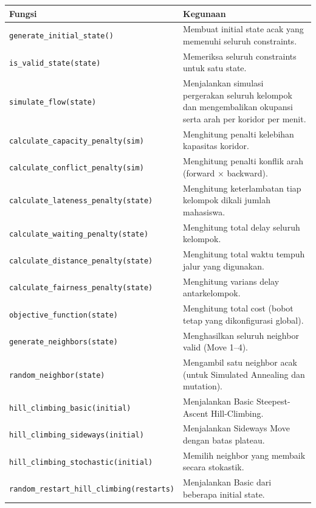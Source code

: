 \documentclass[11pt,a4paper]{article}
\begin{document}
{\footnotesize
\begin{tabularx}{\textwidth}{|>{\raggedright\arraybackslash}p{6.5cm}|>{\raggedright\arraybackslash}X|}
\hline
\textbf{Fungsi} & \textbf{Kegunaan} \\
\hline
\texttt{generate\_initial\_state()} & Membuat initial state acak yang memenuhi seluruh constraints. \\
\hline
\texttt{is\_valid\_state(state)} & Memeriksa seluruh constraints untuk satu state. \\
\hline
\texttt{simulate\_flow(state)} & Menjalankan simulasi pergerakan seluruh kelompok dan mengembalikan okupansi serta arah per koridor per menit. \\
\hline
\texttt{calculate\_capacity\_penalty(sim)} & Menghitung penalti kelebihan kapasitas koridor. \\
\hline
\texttt{calculate\_conflict\_penalty(sim)} & Menghitung penalti konflik arah (forward $\times$ backward). \\
\hline
\texttt{calculate\_lateness\_penalty(state)} & Menghitung keterlambatan tiap kelompok dikali jumlah mahasiswa. \\
\hline
\texttt{calculate\_waiting\_penalty(state)} & Menghitung total delay seluruh kelompok. \\
\hline
\texttt{calculate\_distance\_penalty(state)} & Menghitung total waktu tempuh jalur yang digunakan. \\
\hline
\texttt{calculate\_fairness\_penalty(state)} & Menghitung varians delay antarkelompok. \\
\hline
\texttt{objective\_function(state)} & Menghitung total cost (bobot tetap yang dikonfigurasi global). \\
\hline
\texttt{generate\_neighbors(state)} & Menghasilkan seluruh neighbor valid (Move 1--4). \\
\hline
\texttt{random\_neighbor(state)} & Mengambil satu neighbor acak (untuk Simulated Annealing dan mutation). \\
\hline
\texttt{hill\_climbing\_basic(initial)} & Menjalankan Basic Steepest-Ascent Hill-Climbing. \\
\hline
\texttt{hill\_climbing\_sideways(initial)} & Menjalankan Sideways Move dengan batas plateau. \\
\hline
\texttt{hill\_climbing\_stochastic(initial)} & Memilih neighbor yang membaik secara stokastik. \\
\hline
\texttt{random\_restart\_hill\_climbing(restarts)} & Menjalankan Basic dari beberapa initial state. \\

\end{tabularx}}
\end{document}
